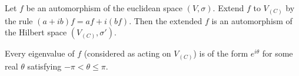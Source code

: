 Let $f$ be an automorphism of the euclidean space $(V, \sigma)$. Extend $f$ to $V_{(C)}$ by the rule $(a + ib)f = af + i(bf)$. Then the extended $f$ is an automorphism of the Hilbert space $(V_{(C)}, \sigma')$.

Every eigenvalue of $f$ (considered as acting on $V_{(C)}$) is of the form $e^{i\theta}$ for some real $\theta$ satisfying $-\pi < \theta \leq \pi$.
